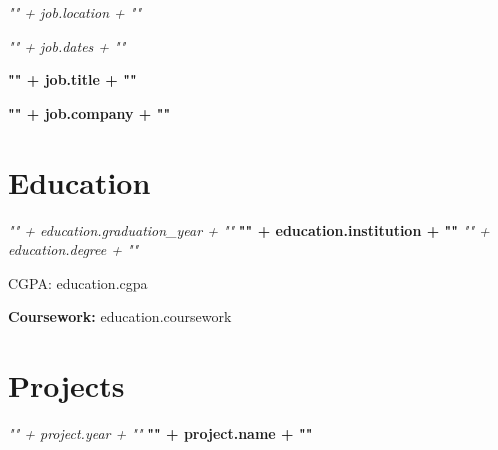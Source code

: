     {%
        \begin{twocolentry}{
            \textit{{ "{" + job.location + "}" }}
            
            \textit{{ "{" + job.dates + "}" }}}
            
            \textbf{{ "{" + job.title + "}" }}
            
            \textbf{{ "{" + job.company + "}" }}
        \end{twocolentry}
        \vspace{0.10 cm}
        \begin{onecolentry}
        \end{onecolentry}
        \vspace{0.2 cm}
    {%

    \section{Education}
    \begin{twocolentry}{
        \textit{{ "{" + education.graduation_year + "}" }}}
        \textbf{{ "{" + education.institution + "}" }}
        \textit{{ "{" + education.degree + "}" }}
    \end{twocolentry}

    \vspace{0.10 cm}

    \begin{onecolentry}
        \begin{highlights}
            \item CGPA: {{ education.cgpa }}
            \item \textbf{Coursework:} {{ education.coursework }}
        \end{highlights}
    \end{onecolentry}

    \section{Projects}
    {%
    \begin{twocolentry}{
    \textit{{ "{" + project.year + "}" }}}
        \textbf{{ "{" + project.name + "}" }}
    \end{twocolentry}

}}}
